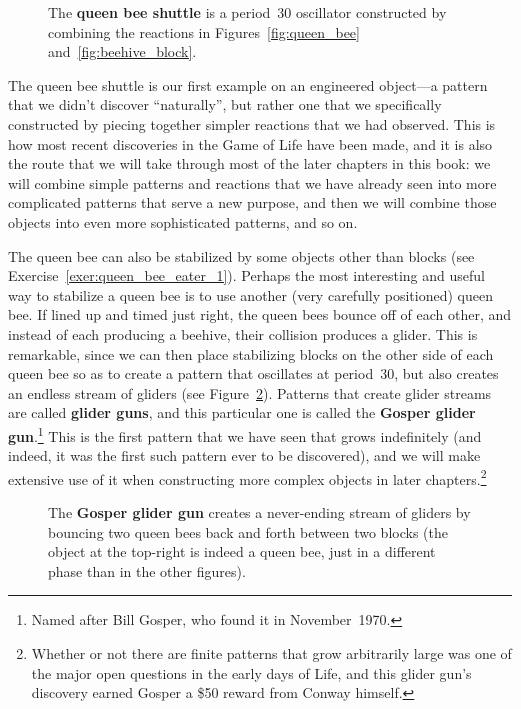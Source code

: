 \begin{figure}[!ht]
	\centering{}
	\caption{The \textbf{queen bee shuttle} is a period~30 oscillator constructed by combining the reactions in Figures~\ref{fig:queen_bee} and~\ref{fig:beehive_block}.}\label{fig:queen_bee_shuttle}
\end{figure}

The queen bee shuttle is our first example on an engineered object---a pattern that we didn't discover ``naturally'', but rather one that we specifically constructed by piecing together simpler reactions that we had observed. This is how most recent discoveries in the Game of Life have been made, and it is also the route that we will take through most of the later chapters in this book: we will combine simple patterns and reactions that we have already seen into more complicated patterns that serve a new purpose, and then we will combine those objects into even more sophisticated patterns, and so on.

The queen bee can also be stabilized by some objects other than blocks (see Exercise~\ref{exer:queen_bee_eater_1}). Perhaps the most interesting and useful way to stabilize a queen bee is to use another (very carefully positioned) queen bee. If lined up and timed just right, the queen bees bounce off of each other, and instead of each producing a beehive, their collision produces a glider. This is remarkable, since we can then place stabilizing blocks on the other side of each queen bee so as to create a pattern that oscillates at period~30, but also creates an endless stream of gliders (see Figure~\ref{fig:gosper_glider_gun}). Patterns that create glider streams are called \textbf{glider guns}, and this particular one is called the \textbf{Gosper glider gun}.\footnote{Named after Bill Gosper, who found it in November~1970.} This is the first pattern that we have seen that grows indefinitely (and indeed, it was the first such pattern ever to be discovered), and we will make extensive use of it when constructing more complex objects in later chapters.\footnote{Whether or not there are finite patterns that grow arbitrarily large was one of the major open questions in the early days of Life, and this glider gun's discovery earned Gosper a \$50 reward from Conway himself.}

\begin{figure}[!htb]
	\centering{}
	\caption{The \textbf{Gosper glider gun} creates a never-ending stream of gliders by bouncing two queen bees back and forth between two blocks (the object at the top-right is indeed a queen bee, just in a different phase than in the other figures).}\label{fig:gosper_glider_gun}
\end{figure}


